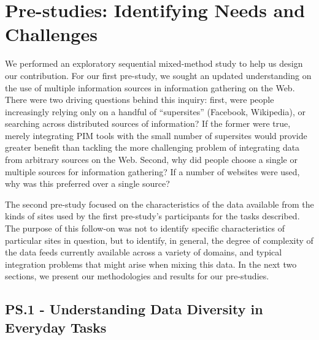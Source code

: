 \documentclass{sigchi}
\begin{document}
\section{Pre-studies: Identifying Needs and Challenges}


We performed an exploratory sequential mixed-method study to help us design our contribution. For our first pre-study, we sought an updated understanding on the use of multiple information sources in information gathering on the Web. There were two driving questions behind this inquiry: first, were people increasingly relying only on a handful of ``supersites'' (Facebook, Wikipedia), or searching across distributed sources of information?  If the former were true, merely integrating PIM tools with the small number of supersites would provide greater benefit than tackling the more challenging problem of integrating data from arbitrary sources on the Web.  Second, why did people choose a single or multiple sources for information gathering?  If a number of websites were used, why was this preferred over a single source?


The second pre-study focused on the characteristics of the data available from the kinds of sites used by the first pre-study's participants for the tasks described. The purpose of this follow-on was not to identify specific characteristics of particular sites in question, but to identify, in general, the degree of complexity of the data feeds currently available across a variety of domains, and typical integration problems that might arise when mixing this data.  In the next two sections, we present our methodologies and results for our pre-studies.


\subsection{PS.1 - Understanding Data Diversity in Everyday Tasks}
\end{document}

